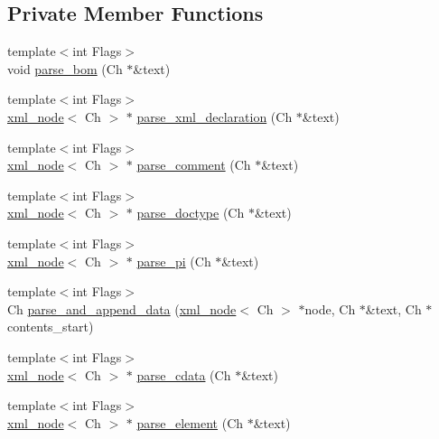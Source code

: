 \subsection*{Private Member Functions}
\begin{DoxyCompactItemize}
\item 
{\footnotesize template$<$int Flags$>$ }\\void \hyperlink{classrapidxml_1_1xml__document_aaa63a0c7b57ab8fce63d4aebe4da123d}{parse\+\_\+bom} (Ch $\ast$\&text)
\item 
{\footnotesize template$<$int Flags$>$ }\\\hyperlink{classrapidxml_1_1xml__node}{xml\+\_\+node}$<$ Ch $>$ $\ast$ \hyperlink{classrapidxml_1_1xml__document_a0151c52c82ba79ea0605c2facf39c534}{parse\+\_\+xml\+\_\+declaration} (Ch $\ast$\&text)
\item 
{\footnotesize template$<$int Flags$>$ }\\\hyperlink{classrapidxml_1_1xml__node}{xml\+\_\+node}$<$ Ch $>$ $\ast$ \hyperlink{classrapidxml_1_1xml__document_abc287ce83bcb2dc8519e300236004591}{parse\+\_\+comment} (Ch $\ast$\&text)
\item 
{\footnotesize template$<$int Flags$>$ }\\\hyperlink{classrapidxml_1_1xml__node}{xml\+\_\+node}$<$ Ch $>$ $\ast$ \hyperlink{classrapidxml_1_1xml__document_a4c613f3a928f763b4c788422edda5860}{parse\+\_\+doctype} (Ch $\ast$\&text)
\item 
{\footnotesize template$<$int Flags$>$ }\\\hyperlink{classrapidxml_1_1xml__node}{xml\+\_\+node}$<$ Ch $>$ $\ast$ \hyperlink{classrapidxml_1_1xml__document_a09e12a4233a07387d4b5a5ad239388aa}{parse\+\_\+pi} (Ch $\ast$\&text)
\item 
{\footnotesize template$<$int Flags$>$ }\\Ch \hyperlink{classrapidxml_1_1xml__document_aec6cedf45179b6378c670bc3ea509e61}{parse\+\_\+and\+\_\+append\+\_\+data} (\hyperlink{classrapidxml_1_1xml__node}{xml\+\_\+node}$<$ Ch $>$ $\ast$node, Ch $\ast$\&text, Ch $\ast$contents\+\_\+start)
\item 
{\footnotesize template$<$int Flags$>$ }\\\hyperlink{classrapidxml_1_1xml__node}{xml\+\_\+node}$<$ Ch $>$ $\ast$ \hyperlink{classrapidxml_1_1xml__document_ab94daeb25e8a1609e31210a45b2afa6c}{parse\+\_\+cdata} (Ch $\ast$\&text)
\item 
{\footnotesize template$<$int Flags$>$ }\\\hyperlink{classrapidxml_1_1xml__node}{xml\+\_\+node}$<$ Ch $>$ $\ast$ \hyperlink{classrapidxml_1_1xml__document_aea385acd096ab200d63a777d53435ada}{parse\+\_\+element} (Ch $\ast$\&text)

\end{DoxyCompactItemize}
